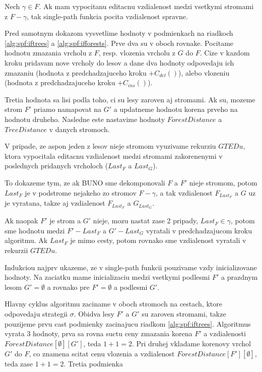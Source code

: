 \begin{lemma}
  Nech $\gamma \in F$. Ak mam vypocitanu editacnu vzdialenost medzi vsetkymi
  stromami z $F - \gamma$, tak single-path funkcia pocita vzdialenost spravne.
\end{lemma}


Pred samotnym dokazom vysvetlime hodnoty v podmienkach na riadkoch \ref{alg:spf:iftrees} a
\ref{alg:spf:ifforests}. Prve dva su v oboch rovnake. Pocitame hodnotu zmazania vrcholu z $F$,
resp. vlozenia vrcholu z $G$ do $F$. Cize v kazdom kroku pridavam nove vrcholy do lesov a dane
dva hodnoty odpovedaju ich zmazaniu (hodnota z predchadzajuceho kroku $+ C_{del}()$), alebo
vlozeniu (hodnota z predchadzajuceho kroku $+ C_{ins}()$).

Tretia hodnota sa lisi podla toho, ci su lesy zaroven aj stromami. Ak su, mozeme strom $F'$
priamo namapovat na $G'$ a updatneme hodnotu korena prveho na hodnotu druheho. Nasledne
este nastavime hodnoty $ForestDistance$ a $TreeDistance$ v danych stromoch.

V pripade, ze aspon jeden z lesov nieje stromom vyuzivame rekurziu $GTEDu$, ktora vypocitala
editacnu vzdialenost medzi stromami zakorenenymi v poslednych pridanych vrcholoch ($Last_{F}$
a $Last_{G}$).

To dokazeme tym, ze ak BUNO sme dekomponovali $F$ a $F'$ nieje stromom,
potom $Last_{F}$ je v podstrome nejakeho zo stromov $F - \gamma$, a tak
vzdialenost $F_{Last_{F}}$ a $G$ uz je vyratana, takze aj vzdialenost $F_{Last_{F}}$ a $G_{Last_{G}}$.

Ak naopak $F'$ je strom a $G'$ nieje, mozu nastat zase 2 pripady, $Last_{F} \in \gamma$,
potom sme hodnotu medzi $F' - Last_{F}$ a $G' - Last_{G}$ vyratali v predchadzajucom kroku
algoritmu. Ak $Last_{F}$ je mimo cesty, potom rovnako sme vzdialenost vyratali v rekurzii $GTEDu$.

\begin{dukaz}
  Indukciou najprv ukazeme, ze v single-path funkcii pouzivame vzdy inicializovane hodnoty.
  Na zaciatku mame inicializaciu medzi vsetkymi podlesmi $F'$ a prazdnym lesom $G' = \emptyset$
  a rovnako pre $F' = \emptyset$ a podlesmi $G'$.

  Hlavny cyklus algoritmu zaciname v oboch stromoch na cestach, ktore odpovedaju strategii $\sigma$.
  Obidva lesy $F'$ a $G'$ su zaroven stromami, takze pouzijeme prvu cast podmienky zacinajucu
  riadkom \ref{alg:spf:iftrees}. Algoritmus vyrata 3 hodnoty, prva sa rovna suctu ceny zmazania
  korena $F'$ a vzdialenosti $ForestDistance[\emptyset][G']$, teda $1 + 1 = 2$.
  Pri druhej vkladame korenovy vrchol $G'$ do $F$, co znamena scitat cenu vlozenia
  a vzdialenost $ForestDistance[F'][\emptyset]$, teda zase $1 + 1 = 2$.
  Tretia podmienka 
\end{dukaz}




